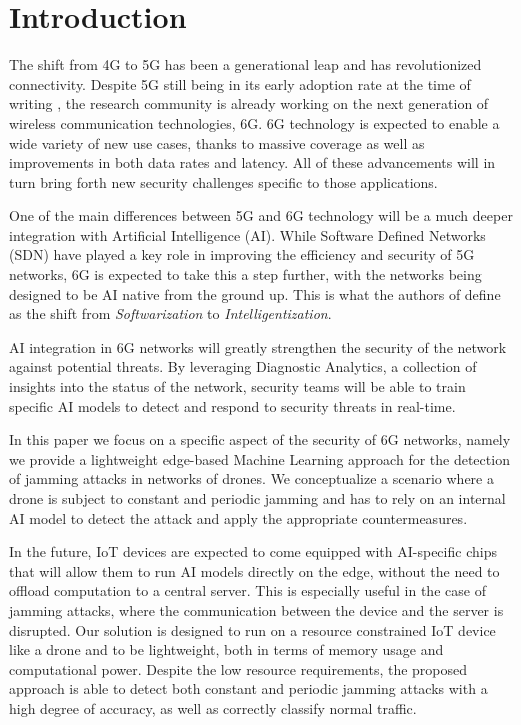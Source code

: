 \documentclass[futureinternet,article,submit,pdftex,moreauthors]{Definitions/mdpi}
\begin{document}
\section{Introduction}

The shift from 4G to 5G has been a generational leap and has revolutionized connectivity. 
Despite 5G still being in its early adoption rate at the time of writing \cite{5GStatisticsTaylor}, the research community is already working on the next generation of wireless communication technologies, 6G. 
6G technology is expected to enable a wide variety of new use cases, thanks to massive coverage as well as improvements in both data rates and latency. All of these advancements will in turn bring forth new security challenges specific to those applications. 

One of the main differences between 5G and 6G technology will be a much deeper integration with Artificial Intelligence (AI). While Software Defined Networks (SDN) have played a key role in improving the efficiency and security 
of 5G networks, 6G is expected to take this a step further, with the networks being designed to be AI native from the ground up. This is what the authors of \cite{6GRoadmapLetaief} define as 
the shift from \textit{Softwarization} to \textit{Intelligentization}. 

AI integration in 6G networks will greatly strengthen the security of the network against potential threats. 
By leveraging Diagnostic Analytics, a collection of insights into the status of the network, security teams 
will be able to train specific AI models to detect and respond to security threats in real-time.

In this paper we focus on a specific aspect of the security of 6G networks, namely we provide a lightweight edge-based Machine Learning approach 
for the detection of jamming attacks in networks of drones. We conceptualize a scenario where a drone is subject to constant and periodic jamming and has to rely on an internal AI model to detect the attack and apply the appropriate countermeasures. 

In the future, IoT devices are expected to come equipped with AI-specific chips that will allow them to run AI models directly on the edge, without the need to offload computation to a central server. This is especially useful in the case of jamming attacks, where the communication between the device and the server is disrupted.
Our solution is designed to run on a resource constrained IoT device like a drone and to be lightweight, both in terms of memory usage and computational power.
Despite the low resource requirements, the proposed approach is able to detect both constant and periodic jamming attacks with a high degree of accuracy, as well as correctly classify normal traffic. 
\end{document}
